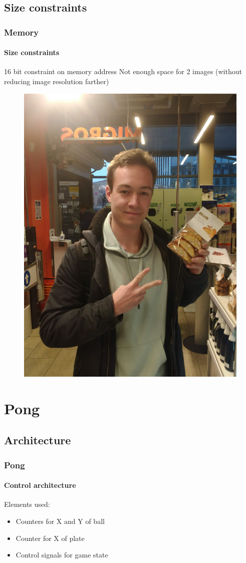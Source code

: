\documentclass{beamer}
\begin{document}
\subsection{Size constraints}
\begin{frame}
    \frametitle{Memory}
    \framesubtitle{Size constraints}
    \begin{alertblock}
        {16 bit constraint on memory address}
        Not enough space for 2 images (without reducing image resolution farther)
    \end{alertblock}
    \begin{figure}
        \includegraphics[width=.3\textwidth]{../_00FINAL_PROJECT/src/mandelbrot_und_so.jpg}
    \end{figure}
\end{frame}


\section{Pong}
\begin{frame}
    \sectionpage
\end{frame}

\subsection{Architecture}
\begin{frame}
    \frametitle{Pong}
    \framesubtitle{Control architecture}
    Elements used:
    \begin{itemize}
        \item Counters for X and Y of ball
        \item Counter for X of plate
        \item Control signals for game state
    \end{itemize}
\end{frame}
\end{document}
